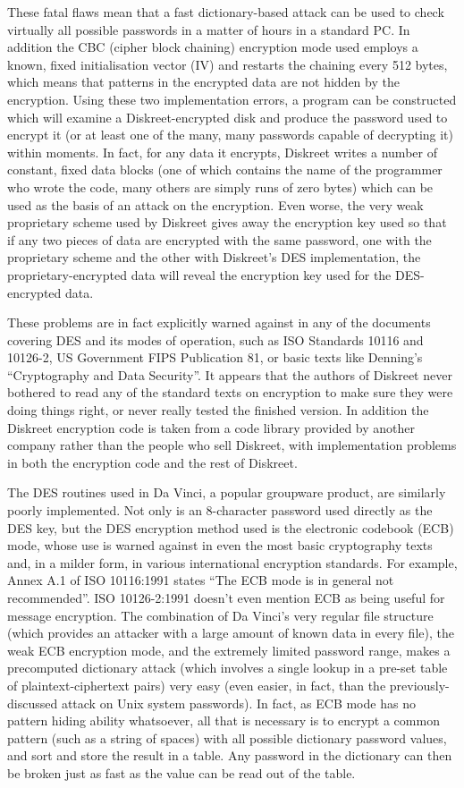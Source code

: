 These fatal flaws mean that a fast dictionary-based attack can be used to check
virtually all possible passwords in a matter of hours in a standard PC.  In
addition the CBC (cipher block chaining) encryption mode used employs a known,
fixed initialisation vector (IV) and restarts the chaining every 512 bytes, 
which means that patterns in the encrypted data are not hidden by the 
encryption.  Using these two implementation errors, a program can be 
constructed which will examine a Diskreet-encrypted disk and produce the 
password used to encrypt it (or at least one of the many, many passwords 
capable of decrypting it) within moments.  In fact, for any data it encrypts,
Diskreet writes a number of constant, fixed data blocks (one of which contains
the name of the programmer who wrote the code, many others are simply runs of
zero bytes) which can be used as the basis of an attack on the encryption.
Even worse, the very weak proprietary scheme used by Diskreet gives away the
encryption key used so that if any two pieces of data are encrypted with the
same password, one with the proprietary scheme and the other with Diskreet's
DES implementation, the proprietary-encrypted data will reveal the encryption
key used for the DES-encrypted data.

These problems are in fact explicitly warned against in any of the documents
covering DES and its modes of operation, such as ISO Standards 10116 and
10126-2, US Government FIPS Publication 81, or basic texts like Denning's
``Cryptography and Data Security''.  It appears that the authors of Diskreet
never bothered to read any of the standard texts on encryption to make sure 
they were doing things right, or never really tested the finished version.  In 
addition the Diskreet encryption code is taken from a code library provided by
another company rather than the people who sell Diskreet, with implementation 
problems in both the encryption code and the rest of Diskreet.

The DES routines used in Da Vinci, a popular groupware product, are similarly
poorly implemented.  Not only is an 8-character password used directly as the
DES key, but the DES encryption method used is the electronic codebook (ECB)
mode, whose use is warned against in even the most basic cryptography texts
and, in a milder form, in various international encryption standards.  For
example, Annex A.1 of ISO 10116:1991 states ``The ECB mode is in general not
recommended''.  ISO 10126-2:1991 doesn't even mention ECB as being useful for
message encryption.  The combination of Da Vinci's very regular file structure
(which provides an attacker with a large amount of known data in every file),
the weak ECB encryption mode, and the extremely limited password range, makes a
precomputed dictionary attack (which involves a single lookup in a pre-set
table of plaintext-ciphertext pairs) very easy (even easier, in fact, than the
previously-discussed attack on Unix system passwords).  In fact, as ECB mode 
has no pattern hiding ability whatsoever, all that is necessary is to encrypt a 
common pattern (such as a string of spaces) with all possible dictionary 
password values, and sort and store the result in a table.  Any password in the 
dictionary can then be broken just as fast as the value can be read out of the 
table.

